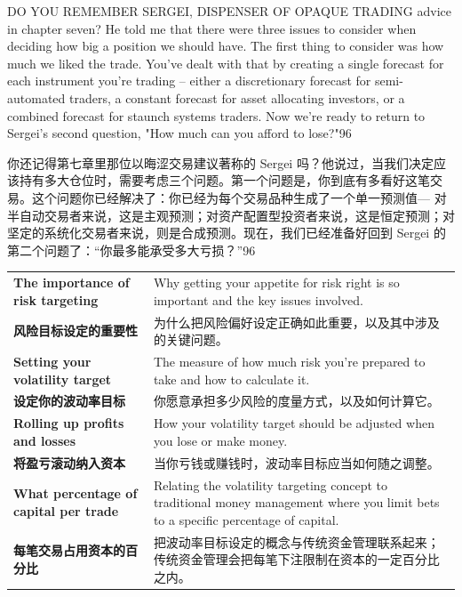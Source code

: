 
\begin{englishblock} DO YOU REMEMBER SERGEI, DISPENSER OF OPAQUE TRADING advice in chapter seven? He told me that there were three issues to consider when deciding how big a position we should have. The first thing to consider was how much we liked the trade. You've dealt with that by creating a single forecast for each instrument you're trading -- either a discretionary forecast for semi-automated traders, a constant forecast for asset allocating investors, or a combined forecast for staunch systems traders. Now we're ready to return to Sergei's second question, "How much can you afford to lose?"96 \end{englishblock}

\begin{chineseblock}你还记得第七章里那位以晦涩交易建议著称的 Sergei 吗？他说过，当我们决定应该持有多大仓位时，需要考虑三个问题。第一个问题是，你到底有多看好这笔交易。这个问题你已经解决了：你已经为每个交易品种生成了一个单一预测值--- 对半自动交易者来说，这是主观预测；对资产配置型投资者来说，这是恒定预测；对坚定的系统化交易者来说，则是合成预测。现在，我们已经准备好回到 Sergei 的第二个问题了：“你最多能承受多大亏损？”96 \end{chineseblock}


\begin{bilingualtableblock} \begin{tabularx}{\textwidth}{@{} L{0.30\textwidth} Y@{}}\textbf{The importance of risk targeting} & Why getting your appetite for risk right is so important and the key issues involved. \\

\textbf{风险目标设定的重要性} & 为什么把风险偏好设定正确如此重要，以及其中涉及的关键问题。 \\
\textbf{Setting your volatility target} & The measure of how much risk you’re prepared to take and how to calculate it. \\
\textbf{设定你的波动率目标} & 你愿意承担多少风险的度量方式，以及如何计算它。 \\
\textbf{Rolling up profits and losses} & How your volatility target should be adjusted when you lose or make money. \\
\textbf{将盈亏滚动纳入资本} & 当你亏钱或赚钱时，波动率目标应当如何随之调整。 \\
\textbf{What percentage of capital per trade} & Relating the volatility targeting concept to traditional money management where you limit bets to a specific percentage of capital. \\
\textbf{每笔交易占用资本的百分比} & 把波动率目标设定的概念与传统资金管理联系起来； 传统资金管理会把每笔下注限制在资本的一定百分比之内。 \\
\end{tabularx}
\end{bilingualtableblock}


